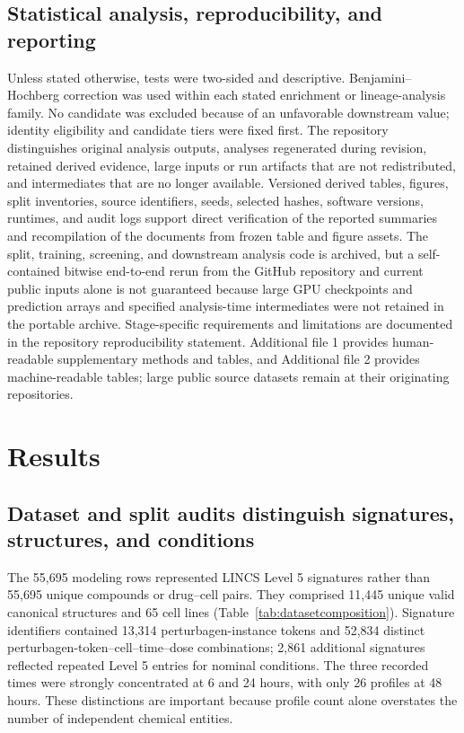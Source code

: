 \subsection{Statistical analysis, reproducibility, and reporting}

\begin{roundtworevision}
Unless stated otherwise, tests were two-sided and descriptive. Benjamini--Hochberg correction was used within each stated enrichment or lineage-analysis family. No candidate was excluded because of an unfavorable downstream value; identity eligibility and candidate tiers were fixed first. The repository distinguishes original analysis outputs, analyses regenerated during revision, retained derived evidence, large inputs or run artifacts that are not redistributed, and intermediates that are no longer available. Versioned derived tables, figures, split inventories, source identifiers, seeds, selected hashes, software versions, runtimes, and audit logs support direct verification of the reported summaries and recompilation of the documents from frozen table and figure assets. The split, training, screening, and downstream analysis code is archived, but a self-contained bitwise end-to-end rerun from the GitHub repository and current public inputs alone is not guaranteed because large GPU checkpoints and prediction arrays and specified analysis-time intermediates were not retained in the portable archive. Stage-specific requirements and limitations are documented in the repository reproducibility statement. Additional file 1 provides human-readable supplementary methods and tables, and Additional file 2 provides machine-readable tables; large public source datasets remain at their originating repositories.
\end{roundtworevision}

\section{Results}

\subsection{Dataset and split audits distinguish signatures, structures, and conditions}

The 55,695 modeling rows represented LINCS Level 5 signatures rather than 55,695 unique compounds or drug--cell pairs. They comprised 11,445 unique valid canonical structures and 65 cell lines (Table~\ref{tab:datasetcomposition}). Signature identifiers contained 13,314 perturbagen-instance tokens and 52,834 distinct perturbagen-token--cell--time--dose combinations; 2,861 additional signatures reflected repeated Level 5 entries for nominal conditions. The three recorded times were strongly concentrated at 6 and 24 hours, with only 26 profiles at 48 hours. These distinctions are important because profile count alone overstates the number of independent chemical entities.

